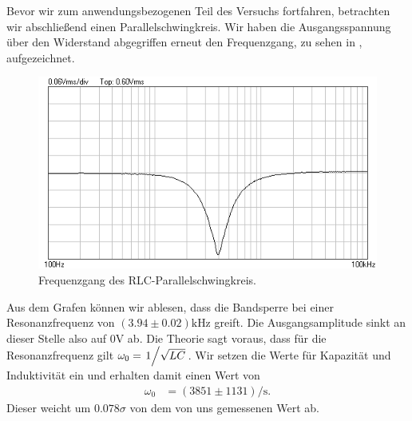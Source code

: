 Bevor wir zum anwendungsbezogenen Teil des Versuchs fortfahren, betrachten wir abschließend einen Parallelschwingkreis. Wir haben die Ausgangsspannung über den Widerstand abgegriffen erneut den Frequenzgang, zu sehen in , aufgezeichnet.


\begin{figure}[H]
  \centering
  \includegraphics[width=.8\textwidth]{files/aufgabe7_parallel_bandsperre.png}
  \caption{Frequenzgang des RLC-Parallelschwingkreis.}
  \label{fig:aufgabe7_parallel_bandsperre}
\end{figure}

Aus dem Grafen können wir ablesen, dass die Bandsperre bei einer Resonanzfrequenz von $(3.94 \pm 0.02)\si{\kilo\hertz}$ greift. Die Ausgangsamplitude sinkt an dieser Stelle also auf $0\si{\volt}$ ab. Die Theorie sagt voraus, dass für die Resonanzfrequenz gilt $\omega_0 = \flatfrac{1}{\sqrt{LC}}$. Wir setzen die Werte für Kapazität und Induktivität ein und erhalten damit einen Wert von
\begin{align}
  \omega_0 &= (3851 \pm 1131) \si{\per\second}.
\end{align}
Dieser weicht um $0.078\sigma$ von dem von uns gemessenen Wert ab.
